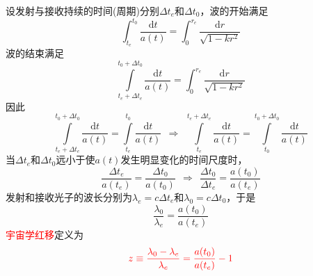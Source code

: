 \documentclass[12pt,a4paper]{article}
\newcommand{\dif}{\mathrm{d}}
\begin{document}
设发射与接收持续的时间(周期)分别$\Delta t_e$和$\Delta  t_0$，波的开始满足
\begin{equation}
\int_{t_{e}}^{t_0} \frac{\dif t}{a(t)} = \int_0^{r_e} \frac{\dif r}{\sqrt{1-kr^2}}
\end{equation}
波的结束满足
\begin{equation}
\int\limits_{t_{e}+\Delta t_e}^{t_0 +\Delta t_0} \frac{\dif t}{a(t)} = \int_0^{r_e} \frac{\dif r}{\sqrt{1-kr^2}}
\end{equation}
因此
\begin{equation}
\int\limits_{t_{e}+\Delta t_e}^{t_0 +\Delta t_0} \frac{\dif t}{a(t)} = \int\limits_{t_{e}}^{t_0} \frac{\dif t}{a(t)} ~~\Rightarrow ~~\int\limits_{t_{e}}^{t_e+\Delta t_e} \frac{\dif t}{a(t)} = \int\limits_{t_0}^{t_0+\Delta t_0} \frac{\dif t}{a(t)} 
\end{equation}
当$\Delta t_e$和$\Delta  t_0$远小于使$a(t)$发生明显变化的时间尺度时，
\begin{equation}
\frac{\Delta t_e}{a(t_e)} = \frac{\Delta t_0}{a(t_0)} ~~\Rightarrow ~~ \frac{\Delta t_0}{\Delta t_e} = \frac{a(t_0)}{a(t_e)} 
\end{equation}
发射和接收光子的波长分别为$\lambda_e = c\Delta t_e$和$\lambda_0 = c\Delta t_0$，于是
\begin{equation}
\frac{\lambda_0}{\lambda_e} = \frac{a(t_0)}{a(t_e)}
\end{equation}
\textcolor{red}{宇宙学红移}定义为
\begin{equation}
\color{red} z \equiv \frac{\lambda_0 -\lambda_e}{\lambda_e} = \frac{a(t_0)}{a(t_e)} -1 
\end{equation}
\end{document}

